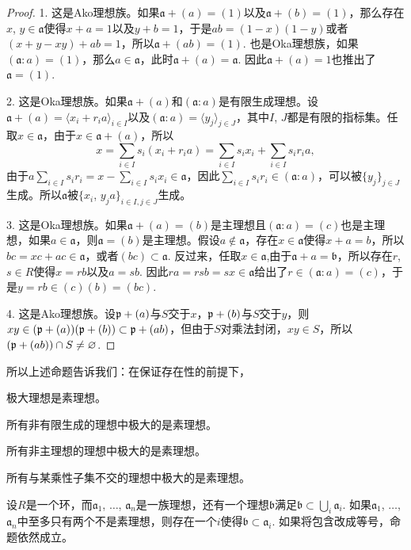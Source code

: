 \begin{proof}
	1. 这是Ako理想族。如果$\mathfrak{a}+(a)=(1)$以及$\mathfrak{a}+(b)=(1)$，那么存在$x$, $y\in \mathfrak{a}$使得$x+a=1$以及$y+b=1$，于是$ab=(1-x)(1-y)$或者$(x+y-xy)+ab=1$，所以$\mathfrak{a}+(ab)=(1)$. 也是Oka理想族，如果$(\mathfrak{a}:a)=(1)$，那么$a\in \mathfrak{a}$，此时$\mathfrak{a}+(a)=\mathfrak{a}$. 因此$\mathfrak{a}+(a)=1$也推出了$\mathfrak{a}=(1)$.

	2. 这是Oka理想族。如果$\mathfrak{a}+(a)$和$(\mathfrak{a}:a)$是有限生成理想。设$\mathfrak{a}+(a)=\langle x_i+r_ia \rangle_{i\in I}$以及$(\mathfrak{a}:a)=\langle y_j\rangle_{j\in J}$，其中$I$, $J$都是有限的指标集。任取$x\in \mathfrak{a}$，由于$x\in \mathfrak{a}+(a)$，所以
	\[
		x= \sum_{i\in I}s_i(x_i+r_ia)=\sum_{i\in I}s_ix_i+\sum_{i\in I}s_ir_ia,
	\]
	由于$a\sum_{i\in I}s_ir_i=x-\sum_{i\in I}s_ix_i\in \mathfrak{a}$，因此$\sum_{i\in I}s_ir_i\in (\mathfrak{a}:a)$，可以被$\{y_j\}_{j\in J}$生成。所以$\mathfrak{a}$被$\{x_i$, $y_ja\}_{i\in I,j\in J}$生成。

	3. 这是Oka理想族。如果$\mathfrak{a}+(a)=(b)$是主理想且$(\mathfrak{a}:a)=(c)$也是主理想，如果$a\in \mathfrak{a}$，则$\mathfrak{a}=(b)$是主理想。假设$a\not\in\mathfrak{a}$，存在$x\in \mathfrak{a}$使得$x+a=b$，所以$bc=xc+ac\in \mathfrak{a}$，或者$(bc)\subset \mathfrak{a}$. 反过来，任取$x\in \mathfrak{a}$,由于$\mathfrak{a}+a=\mathfrak{b}$，所以存在$r$, $s\in R$使得$x=rb$以及$a=sb$. 因此$ra=rsb=sx\in\mathfrak{a}$给出了$r\in (\mathfrak{a}:a)=(c)$，于是$y=rb\in (c)(b)=(bc)$.

	4. 这是Ako理想族。设$\mathfrak{p}+(a)$与$S$交于$x$，$\mathfrak{p}+(b)$与$S$交于$y$，则$xy\in (\mathfrak{p}+(a))(\mathfrak{p}+(b))\subset \mathfrak{p}+(ab)$，但由于$S$对乘法封闭，$xy\in S$，所以$(\mathfrak{p}+(ab))\cap S\neq \varnothing$.
\end{proof}

所以上述命题告诉我们：在保证存在性的前提下，
\begin{compactenum}[~~~1.]
\item 极大理想是素理想。
\item 所有非有限生成的理想中极大的是素理想。
\item 所有非主理想的理想中极大的是素理想。
\item 所有与某乘性子集不交的理想中极大的是素理想。
\end{compactenum}

\begin{pro} \label{primeav}设$R$是一个环，而$\mathfrak{a}_1$, $\dots$, $\mathfrak{a}_n$是一族理想，还有一个理想$\mathfrak{b}$满足$\mathfrak{b}\subset \bigcup_i \mathfrak{a}_i$. 如果$\mathfrak{a}_1$, $\dots$, $\mathfrak{a}_n$中至多只有两个不是素理想，则存在一个$i$使得$\mathfrak{b}\subset \mathfrak{a}_i$. 如果将包含改成等号，命题依然成立。
\end{pro}


